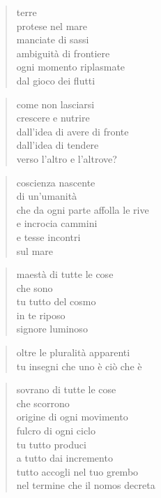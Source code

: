 \clearpage


\vspace*{2cm}

	\begin{verse}
		terre\\
		protese nel mare\\
		manciate di sassi\\
		ambiguità di frontiere\\
		ogni momento riplasmate\\
		dal gioco dei flutti
	\end{verse}

	\begin{verse}
		come non lasciarsi\\
		crescere e nutrire\\
		dall’idea di avere di fronte\\
		dall’idea di tendere\\
		verso l’altro e l’altrove?
	\end{verse}

	\begin{verse}
		coscienza nascente\\
		di un’umanità\\
		che da ogni parte affolla le rive\\
		e incrocia cammini\\
		e tesse incontri\\
		sul mare
	\end{verse}

\clearpage


\vspace*{2cm}

	\begin{verse}
		maestà di tutte le cose\\
		che sono\\
		tu tutto del cosmo\\
		in te riposo\\
		signore luminoso
	\end{verse}

	\begin{verse}
		oltre le pluralità apparenti\\
		tu insegni che uno è ciò che è
	\end{verse}

	\begin{verse}
		sovrano di tutte le cose\\
		che scorrono\\
		origine di ogni movimento\\
		fulcro di ogni ciclo\\
		tu tutto produci\\
		a tutto dai incremento\\
		tutto accogli nel tuo grembo\\
		nel termine che il nomos decreta
	\end{verse}

